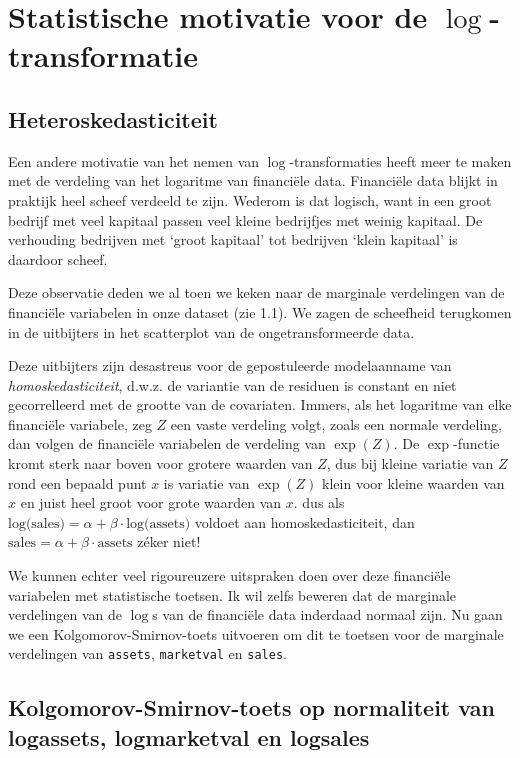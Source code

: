 \documentclass[a4paper]{report}
\begin{document}
\section{Statistische motivatie voor de $\log$-transformatie} 
\subsection{Heteroskedasticiteit}
  Een andere motivatie van het nemen van $\log$-transformaties heeft meer te maken met de verdeling van het logaritme van financi\"ele data. Financi\"ele data blijkt in praktijk heel scheef verdeeld te zijn. Wederom is dat logisch, want in een groot bedrijf met veel kapitaal passen veel kleine bedrijfjes met weinig kapitaal. De verhouding bedrijven met `groot kapitaal' tot bedrijven `klein kapitaal' is daardoor scheef. 
  
  Deze observatie deden we al toen we keken naar de marginale verdelingen van de financi\"ele variabelen in onze dataset (zie 1.1). We zagen de scheefheid terugkomen in de uitbijters in het scatterplot van de ongetransformeerde data.
  
  Deze uitbijters zijn desastreus voor de gepostuleerde modelaanname van \emph{homoskedasticiteit}, d.w.z. de variantie van de residuen is constant en niet gecorrelleerd met de grootte van de covariaten. Immers, als het logaritme van elke financi\"ele variabele, zeg $Z$ een vaste verdeling volgt, zoals een normale verdeling, dan volgen de financi\"ele variabelen de verdeling van $\exp(Z)$. De $\exp$-functie kromt sterk naar boven voor grotere waarden van $Z$, dus bij kleine variatie van $Z$ rond een bepaald punt $x$ is variatie van $\exp(Z)$ klein voor kleine waarden van $x$ en juist heel groot voor grote waarden van $x$. dus als $\text{log(sales)} = \alpha + \beta \cdot \text{log(assets)}$ voldoet aan homoskedasticiteit, dan $\text{sales} = \alpha + \beta \cdot \text{assets}$ z\' eker niet!
  
  We kunnen echter veel rigoureuzere uitspraken doen over deze financi\"ele variabelen met statistische toetsen. Ik wil zelfs beweren dat de marginale verdelingen van de $\log$s van de financi\"ele data inderdaad normaal zijn. Nu gaan we een Kolgomorov-Smirnov-toets uitvoeren om dit te toetsen voor de marginale verdelingen van \verb!assets!, \verb!marketval! en \verb!sales!.
  
\subsection{Kolgomorov-Smirnov-toets op normaliteit van logassets, logmarketval en logsales}  
  
\end{document}
